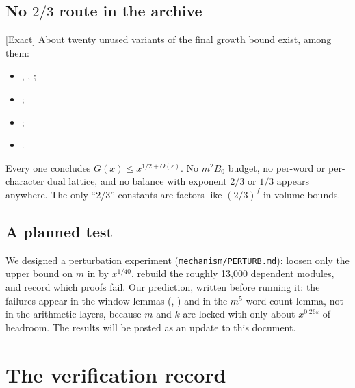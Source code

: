 \documentclass[11pt]{article}
\newcommand{\Exact}{\textcolor{exactc}{\textsf{\small[Exact]}}}
\newcommand{\eps}{\varepsilon}
\theoremstyle{plain}
\theoremstyle{definition}
\begin{document}
\subsection{No $2/3$ route in the archive}\label{sec:no23}

\Exact{} About twenty unused variants of the final growth bound exist, among them:
\begin{itemize}
\item {}, , ;
\item {};
\item {};
\item {}.
\end{itemize}
Every one concludes $G(x)\le x^{1/2+O(\eps)}$. No
$m^2B_0$ budget, no per-word or per-character dual lattice, and no balance with exponent $2/3$ or
$1/3$ appears anywhere. The only ``$2/3$'' constants are factors like $(2/3)^f$ in volume bounds.

\subsection{A planned test}

We designed a perturbation experiment (\texttt{mechanism/PERTURB.md}): loosen only the upper bound
on $m$ in  by $x^{1/40}$, rebuild the roughly 13{,}000 dependent modules, and record
which proofs fail. Our prediction, written before running it: the failures appear in the window
lemmas (, ) and in the $m^5$ word-count lemma, not in the
arithmetic layers, because $m$ and $k$ are locked with only about $x^{0.26\eps}$ of headroom.
The results will be posted as an update to this document.

\section{The verification record}\label{sec:verify}
\end{document}
